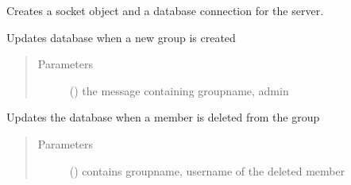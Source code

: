 \documentclass[letterpaper,10pt,english]{sphinxmanual}
\begin{document}
\begin{fulllineitems}
\label{\detokenize{server:server.createServer}}
Creates a socket object and a database connection for the server.

\end{fulllineitems}


\begin{fulllineitems}
\label{\detokenize{server:server.create_group}}
Updates database when a new group is created
\begin{quote}\begin{description}
\item[{Parameters}] \leavevmode
{} () \textendash{} the message containing groupname, admin

\end{description}\end{quote}

\end{fulllineitems}


\begin{fulllineitems}
\label{\detokenize{server:server.delete_member}}
Updates the database when a member is deleted from the group
\begin{quote}\begin{description}
\item[{Parameters}] \leavevmode
{} () \textendash{} contains groupname, username of the deleted member

\end{description}\end{quote}

\end{fulllineitems}
\end{document}
